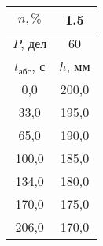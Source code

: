 \begin{tabular}[t]{|c|c|}
\hline
$n, \%$ & 1.5 \\
\hline
$P$, дел & 60 \\
\hline
$t_{абс}$, с & $h$, мм \\ 
\hline
0,0 & 200,0 \\ 
33,0 & 195,0 \\ 
65,0 & 190,0 \\ 
100,0 & 185,0 \\ 
134,0 & 180,0 \\ 
170,0 & 175,0 \\ 
206,0 & 170,0 \\ 
\hline
\end{tabular}